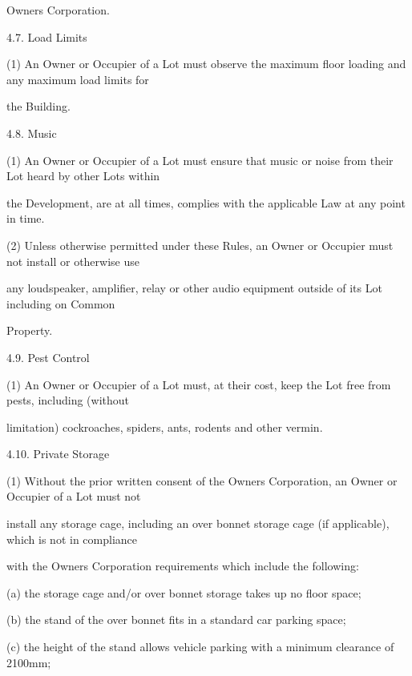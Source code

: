 \documentclass{article}
\begin{document}
{\fontsize{10.02}{1}Owners Corporation. }

{\fontsize{9.99}{1}4.7. Load Limits }

{\fontsize{9.962}{1}(1) An Owner or Occupier of a Lot must observe the maximum floor loading and any maximum load limits for }

{\fontsize{10.02}{1}the Building. }

{\fontsize{9.99}{1}4.8. Music }

{\fontsize{9.962}{1}(1) An Owner or Occupier of a Lot must ensure that music or noise from their Lot heard by other Lots within }

{\fontsize{10.02}{1}the Development, are at all times, complies with the applicable Law at any point in time. }

\newpage

{\fontsize{9.962}{1}(2) Unless otherwise permitted under these Rules, an Owner or Occupier must not install or otherwise use }

{\fontsize{10.02}{1}any loudspeaker, amplifier, relay or other audio equipment outside of its Lot including on Common }

{\fontsize{10.02}{1}Property. }

{\fontsize{9.99}{1}4.9. Pest Control }

{\fontsize{9.962}{1}(1) An Owner or Occupier of a Lot must, at their cost, keep the Lot free from pests, including (without }

{\fontsize{10.02}{1}limitation) cockroaches, spiders, ants, rodents and other vermin. }

{\fontsize{9.99}{1}4.10. Private Storage }

{\fontsize{9.962}{1}(1) Without the prior written consent of the Owners Corporation, an Owner or Occupier of a Lot must not }

{\fontsize{10.02}{1}install any storage cage, including an over bonnet storage cage (if applicable), which is not in compliance }

{\fontsize{10.02}{1}with the Owners Corporation requirements which include the following: }

{\fontsize{9.962}{1}(a) the storage cage and/or over bonnet storage takes up no floor space; }

{\fontsize{9.962}{1}(b) the stand of the over bonnet fits in a standard car parking space; }

{\fontsize{9.962}{1}(c) the height of the stand allows vehicle parking with a minimum clearance of 2100mm; }
\end{document}
